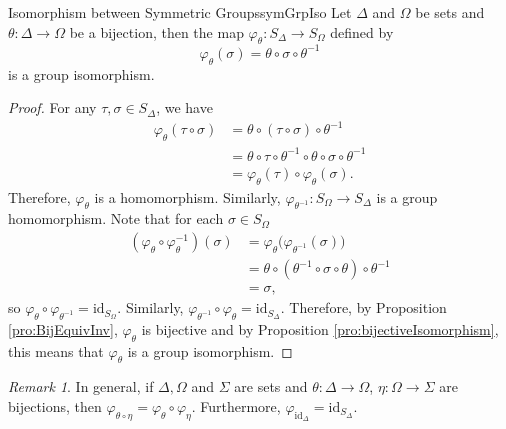 \documentclass[math]{amznotes}
\theoremstyle{remark}
\newtheorem*{remark}{Remark}
\newcommand{\0}{\mathbf{0}}
\newcommand{\1}{\mathbf{1}}
\begin{document}
\begin{probox}{Isomorphism between Symmetric Groups}{symGrpIso}
    Let $\Delta$ and $\Omega$ be sets and $\theta \colon \Delta \to \Omega$ be a bijection, then the map $\varphi_{\theta} \colon S_{\Delta} \to S_{\Omega}$ defined by 
    \begin{equation*}
        \varphi_{\theta}\left(\sigma\right) = \theta \circ \sigma \circ \theta^{-1}
    \end{equation*}
    is a group isomorphism.
    \tcblower
    \begin{proof}
        For any $\tau, \sigma \in S_{\Delta}$, we have 
        \begin{align*}
            \varphi_{\theta}\left(\tau \circ \sigma\right) & = \theta \circ \left(\tau \circ \sigma\right) \circ \theta^{-1} \\
            & = \theta \circ \tau \circ \theta^{-1} \circ \theta \circ \sigma \circ \theta^{-1} \\
            & = \varphi_{\theta}\left(\tau\right) \circ \varphi_{\theta}\left(\sigma\right).
        \end{align*}
        Therefore, $\varphi_{\theta}$ is a homomorphism. Similarly, $\varphi_{\theta^{-1}} \colon S_{\Omega} \to S_{\Delta}$ is a group homomorphism. Note that for each $\sigma \in S_{\Omega}$
        \begin{align*}
            \left(\varphi_{\theta} \circ \varphi_{\theta}^{-1}\right)\left(\sigma\right) & = \varphi_{\theta}\bigl(\varphi_{\theta^{-1}}\left(\sigma\right)\bigr) \\
            & = \theta \circ \left(\theta^{-1} \circ \sigma \circ \theta\right) \circ \theta^{-1} \\
            & = \sigma,
        \end{align*} 
        so $\varphi_{\theta} \circ \varphi_{\theta^{-1}} = \mathrm{id}_{S_{\Omega}}$. Similarly, $\varphi_{\theta^{-1}} \circ \varphi_{\theta} = \mathrm{id}_{S_{\Delta}}$. Therefore, by Proposition \ref{pro:BijEquivInv}, $\varphi_{\theta}$ is bijective and by Proposition \ref{pro:bijectiveIsomorphism}, this means that $\varphi_{\theta}$ is a group isomorphism.
    \end{proof}
\end{probox}
\begin{notebox}
    \begin{remark}
        In general, if $\Delta, \Omega$ and $\Sigma$ are sets and $\theta \colon \Delta \to \Omega$, $\eta \colon \Omega \to \Sigma$ are bijections, then $\varphi_{\theta \circ \eta} = \varphi_{\theta} \circ \varphi_{\eta}$. Furthermore, $\varphi_{\mathrm{id}_{\Delta}} = \mathrm{id}_{S_{\Delta}}$.
    \end{remark}
\end{notebox}
\end{document}
